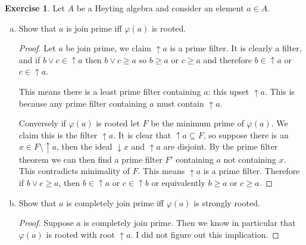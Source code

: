 \documentclass{article}
\theoremstyle{definition}
\newtheorem{question}{Exercise}
\begin{document}
\begin{question}
    Let \(A\) be a Heyting algebra and consider an element \(a\in A\).

    \begin{enumerate}[(a)]
        \item Show that \(a\) is join prime iff \(\varphi(a)\) is rooted.

              \begin{proof}
                  Let \(a\) be join prime, we claim \(\uparrow a\) is a prime
                  filter. It is clearly a filter, and if \(b\vee c\in\uparrow
                  a\) then \(b\vee c\geq a\) so \(b\geq a\) or \(c\geq a\) and
                  therefore \(b\in\uparrow a\) or \(c\in\uparrow a\).

                  This means there is a least prime filter containing \(a\):
                  this upset \(\uparrow a\). This is because any prime filter
                  containing \(a\) must contain \(\uparrow a\).

                  Conversely if \(\varphi(a)\) is rooted let \(F\) be the
                  minimum prime of \(\varphi(a)\). We claim this is the filter
                  \(\uparrow a\). It is clear that \(\uparrow a\subseteq F\), so
                  suppose there is an \(x\in F\setminus\uparrow a\), then the
                  ideal \(\downarrow x\) and \(\uparrow a\) are disjoint. By the
                  prime filter theorem we can then find a prime filter \(F'\)
                  containing \(a\) not containing \(x\). This contradicts
                  minimality of \(F\). This means \(\uparrow a\) is a prime
                  filter. Therefore if \(b\vee c\geq a\), then \(b\in\uparrow
                  a\) or \(c\in\uparrow b\) or equivalently \(b\geq a\) or
                  \(c\geq a\).
              \end{proof}

        \item Show that \(a\) is completely join prime iff \(\varphi(a)\) is
              strongly rooted.

              \begin{proof}
                  Suppose \(a\) is completely join prime. Then we know in
                  particular that \(\varphi(a)\) is rooted with root \(\uparrow
                  a\). I did not figure out this implication.


\end{proof}
\end{enumerate}
\end{question}
\end{document}
